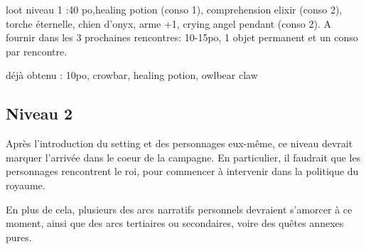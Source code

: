 \documentclass[10pt,a4paper]{book}
\begin{document}
loot niveau 1 :40 po,healing potion (conso 1), comprehension elixir (conso 2), torche éternelle, chien d'onyx, arme +1, crying angel pendant (conso 2). A fournir dans les 3 prochaines rencontres:
10-15po, 1 objet permanent et un conso par rencontre.

déjà obtenu : 10po, crowbar, healing potion, owlbear claw
\subsection{Niveau 2}
Après l'introduction du setting et des personnages eux-même, ce niveau devrait marquer l'arrivée dans le coeur de la campagne. En particulier, il faudrait que les personnages rencontrent le roi, pour commencer à intervenir dans la politique du royaume.

En plus de cela, plusieurs des arcs narratifs personnels devraient s'amorcer à ce moment, ainsi que des arcs tertiaires ou secondaires, voire des quêtes annexes pures.
\end{document}
